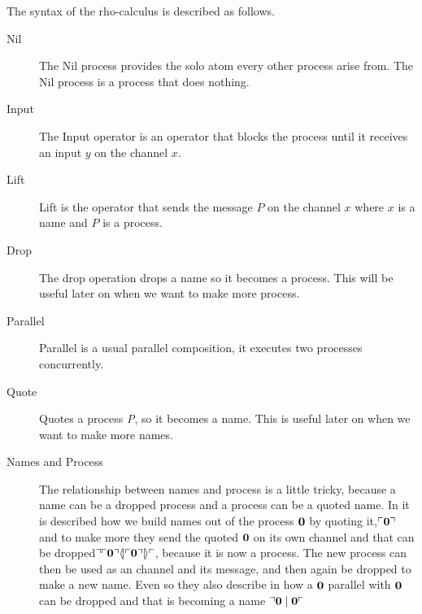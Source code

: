 The syntax of the rho-calculus is described as follows.\\

\begin{description}
    \item[Nil] The Nil process provides the solo atom every other process arise from. The Nil process is a process that does nothing.
    \item[Input] The Input operator is an operator that blocks the process until it receives an input $y$ on the channel $x$.
    \item[Lift] Lift is the operator that sends the message $P$ on the channel $x$ where $x$ is a name and $P$ is a process.
    \item[Drop] The drop operation drops a name so it becomes a process. This will be useful later on when we want to make more process.
    \item[Parallel] Parallel is a usual parallel composition, it executes two processes concurrently.
    \item[Quote] Quotes a process \textit{P}, so it becomes a name. This is useful later on when we want to make more names.
    \item[Names and Process] The relationship between names and process is a little tricky, because a name can be a dropped process and a process can be a quoted name. In \citep{Meredith2005} it is described how we build names out of the process $\mathbf{0}$ by quoting it,$\ulcorner \mathbf{0} \urcorner$ and to make more they send the quoted $\mathbf{0}$ on its own channel and that can be dropped$\urcorner \ulcorner \mathbf{0} \urcorner \langle \! | \ulcorner \mathbf{0} \urcorner | \! \rangle \ulcorner$, because it is now a process. The new process can then be used as an channel and its message, and then again be dropped to make a new name. Even so they also describe in \citep{Meredith2005} how a $\mathbf{0}$ parallel with $\mathbf{0}$ can be dropped and that is becoming a name $\urcorner \mathbf{0} \mid \mathbf{0} \ulcorner$
\end{description}
